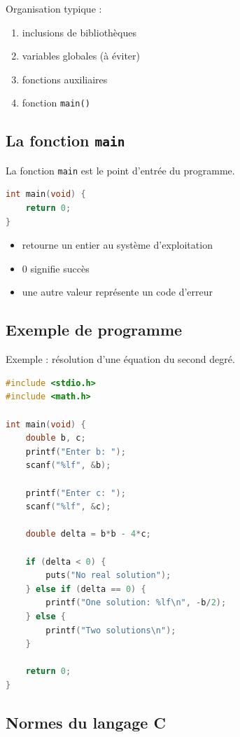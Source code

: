 Organisation typique :

\begin{enumerate}
    \item inclusions de bibliothèques
    \item variables globales (à éviter)
    \item fonctions auxiliaires
    \item fonction \texttt{main()}
\end{enumerate}

\subsection{La fonction \texttt{main}}

La fonction \texttt{main} est le point d’entrée du programme.

\begin{lstlisting}[language=C]
int main(void) {
    return 0;
}
\end{lstlisting}

\begin{itemize}
    \item retourne un entier au système d’exploitation
    \item 0 signifie succès
    \item une autre valeur représente un code d’erreur
\end{itemize}

\subsection{Exemple de programme}

Exemple : résolution d’une équation du second degré.

\begin{lstlisting}[language=C]
#include <stdio.h>
#include <math.h>

int main(void) {
    double b, c;
    printf("Enter b: ");
    scanf("%lf", &b);

    printf("Enter c: ");
    scanf("%lf", &c);

    double delta = b*b - 4*c;

    if (delta < 0) {
        puts("No real solution");
    } else if (delta == 0) {
        printf("One solution: %lf\n", -b/2);
    } else {
        printf("Two solutions\n");
    }

    return 0;
}
\end{lstlisting}

\subsection{Normes du langage C}

